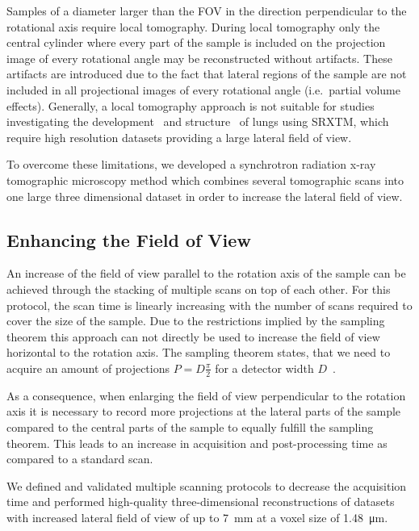 Samples of a diameter larger than the FOV in the direction perpendicular to the rotational axis require local tomography. During local tomography only the central cylinder where every part of the sample is included on the projection image of every rotational angle may be reconstructed without artifacts. These artifacts are introduced due to the fact that lateral regions of the sample are not included in all projectional images of every rotational angle (i.e.\ partial volume effects). Generally, a local tomography approach is not suitable for studies investigating the development~\cite{Schittny2008,Mund2008} and structure~\cite{Tsuda2008} of lungs using SRXTM, which require high resolution datasets providing a large lateral field of view.

To overcome these limitations, we developed a synchrotron radiation x-ray tomographic microscopy method which combines several tomographic scans into one large three dimensional dataset in order to increase the lateral field of view.

\subsection{Enhancing the Field of View}\label{subsec:enhancing the field of view}%
An increase of the field of view parallel to the rotation axis of the sample can be achieved through the stacking of multiple scans on top of each other. For this protocol, the scan time is linearly increasing with the number of scans required to cover the size of the sample. Due to the restrictions implied by the sampling theorem this approach can not directly be used to increase the field of view horizontal to the rotation axis. The sampling theorem states, that we need to acquire an amount of projections $P=D\frac{\pi}{2}$ for a detector width $D$~\cite[page 186]{Kak2002}.

As a consequence, when enlarging the field of view perpendicular to the rotation axis it is necessary to record more projections at the lateral parts of the sample compared to the central parts of the sample to equally fulfill the sampling theorem. This leads to an increase in acquisition and post-processing time as compared to a standard scan.

We defined and validated multiple scanning protocols to decrease the acquisition time and performed high-quality three-dimensional reconstructions of datasets with increased lateral field of view of up to \SI{7}{\milli\meter} at a voxel size of \SI{1.48}{\micro\meter}.